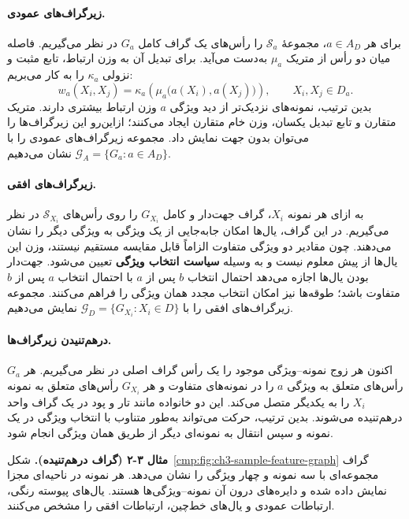 \paragraph{زیرگراف‌های عمودی.}
برای هر $a\in A_D$، مجموعهٔ $\mathcal S_a$ را رأس‌های یک گراف کامل $G_a$ در نظر می‌گیریم. فاصله میان دو رأس از متریک $\mu_a$ به‌دست می‌آید. برای تبدیل آن به وزن ارتباط، تابع مثبت و نزولی $\kappa_a$ را به کار می‌بریم:
\begin{equation}\label{cmp:eq:ch3-edge-weight}
w_a(X_i,X_j)=\kappa_a\!\left(\mu_a\bigl(a(X_i),a(X_j)\bigr)\right),
\qquad X_i,X_j\in D_a.
\end{equation}
بدین ترتیب، نمونه‌های نزدیک‌تر از دید ویژگی $a$ وزن ارتباط بیشتری دارند. متریک متقارن و تابع تبدیل یکسان، وزن خام متقارن ایجاد می‌کنند؛ ازاین‌رو این زیرگراف‌ها را می‌توان بدون جهت نمایش داد. مجموعه زیرگراف‌های عمودی را با $\mathcal G_A=\{G_a:a\in A_D\}$ نشان می‌دهیم.

\paragraph{زیرگراف‌های افقی.}
به ازای هر نمونه $X_i$، گراف جهت‌دار و کامل $G_{X_i}$ را روی رأس‌های $\mathcal S_{X_i}$ در نظر می‌گیریم. در این گراف، یال‌ها امکان جابه‌جایی از یک ویژگی به ویژگی دیگر را نشان می‌دهند. چون مقادیر دو ویژگی متفاوت الزاماً قابل مقایسه مستقیم نیستند، وزن این یال‌ها از پیش معلوم نیست و به وسیله \textbf{سیاست انتخاب ویژگی} تعیین می‌شود. جهت‌دار بودن یال‌ها اجازه می‌دهد احتمال انتخاب $b$ پس از $a$ با احتمال انتخاب $a$ پس از $b$ متفاوت باشد؛ طوقه‌ها نیز امکان انتخاب مجدد همان ویژگی را فراهم می‌کنند. مجموعه زیرگراف‌های افقی را با $\mathcal G_D=\{G_{X_i}:X_i\in D\}$ نمایش می‌دهیم.

\paragraph{درهم‌تنیدن زیرگراف‌ها.}
اکنون هر زوج نمونه--ویژگی موجود را یک رأس گراف اصلی در نظر می‌گیریم. هر $G_a$ رأس‌های متعلق به ویژگی $a$ را در نمونه‌های متفاوت و هر $G_{X_i}$ رأس‌های متعلق به نمونه $X_i$ را به یکدیگر متصل می‌کند. این دو خانواده مانند تار و پود در یک گراف واحد درهم‌تنیده می‌شوند. بدین ترتیب، حرکت می‌تواند به‌طور متناوب با انتخاب ویژگی در یک نمونه و سپس انتقال به نمونه‌ای دیگر از طریق همان ویژگی انجام شود.

\noindent\textbf{مثال ۳-۲ (گراف درهم‌تنیده).}
شکل~\ref{cmp:fig:ch3-sample-feature-graph} گراف مجموعه‌ای با سه نمونه و چهار ویژگی را نشان می‌دهد. هر نمونه در ناحیه‌ای مجزا نمایش داده شده و دایره‌های درون آن نمونه--ویژگی‌ها هستند. یال‌های پیوسته رنگی، ارتباطات عمودی و یال‌های خط‌چین، ارتباطات افقی را مشخص می‌کنند.

